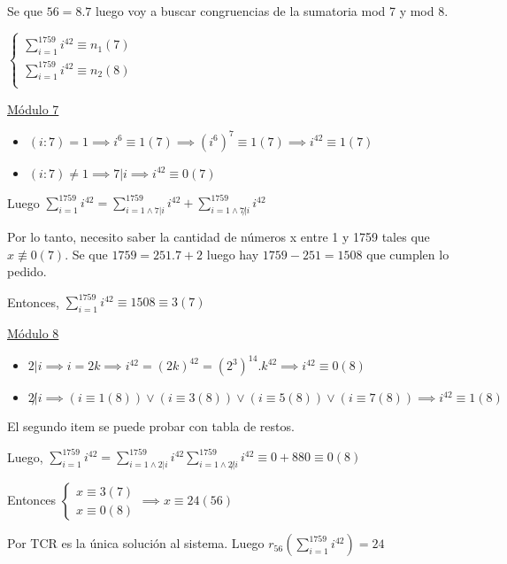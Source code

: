 Se que $ 56 = 8 . 7 $ luego voy a buscar congruencias de la sumatoria mod 7 y mod 8.

$ \begin{cases}
    \sum_{i=1}^{1759}i^{42} \equiv n_1 (7) \\
    \sum_{i=1}^{1759}i^{42} \equiv n_2 (8) \\
\end{cases} $

\underline{Módulo 7}

\begin{itemize}
    \item $ (i:7) = 1 \implies i^6 \equiv 1(7) \implies (i^6)^7 \equiv 1(7) \implies i^{42} \equiv 1(7) $
    \item $ (i:7) \neq 1 \implies 7|i \implies i^{42} \equiv 0(7) $
\end{itemize}

Luego $ \sum_{i=1}^{1759}i^{42} = \sum_{i=1 \wedge 7|i}^{1759}i^{42} + \sum_{i=1 \wedge 7\not | i}^{1759}i^{42} $

Por lo tanto, necesito saber la cantidad de números x entre 1 y 1759 tales que $ x \not \equiv 0(7) $. Se que $ 1759 = 251.7+2 $ luego hay $ 1759-251=1508 $ que cumplen lo pedido.

Entonces, $ \sum_{i=1}^{1759}i^{42} \equiv 1508 \equiv 3(7) $

\underline{Módulo 8}

\begin{itemize}
    \item $ 2|i \implies i = 2k \implies i^{42} = (2k)^{42} = (2^3)^{14}. k^{42} \implies i^{42} \equiv 0(8) $
    \item $ 2 \not | i \implies (i \equiv 1(8)) \vee (i \equiv 3(8)) \vee (i \equiv 5(8)) \vee (i \equiv 7(8)) \implies i^{42} \equiv 1(8)$
\end{itemize}

El segundo item se puede probar con tabla de restos.

Luego, $ \sum_{i=1}^{1759}i^{42} = \sum_{i=1 \wedge 2|i}^{1759}i^{42} \sum_{i=1 \wedge 2\not |i}^{1759}i^{42} \equiv 0+880\equiv 0(8)$

Entonces $ \begin{cases}
    x \equiv 3(7) \\
    x \equiv 0(8) 
\end{cases} \implies x\equiv 24(56) $

Por TCR es la única solución al sistema. Luego $ r_{56}(\sum_{i=1}^{1759}i^{42}) = 24 $

